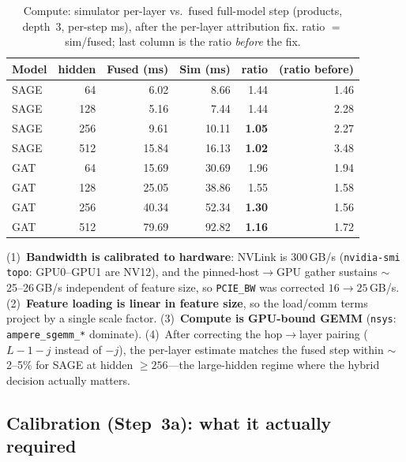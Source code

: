 \begin{table}[h]
\centering
\caption{Compute: simulator per-layer vs.\ fused full-model step (products, depth~3,
per-step ms), after the per-layer attribution fix. ratio $=$ sim/fused; last column is
the ratio \emph{before} the fix.}
\label{tab:micro-compute}
\begin{tabular}{l r r r r r}
\toprule
Model & hidden & Fused (ms) & Sim (ms) & ratio & (ratio before) \\
\midrule
SAGE & 64  & 6.02  & 8.66  & 1.44 & 1.46 \\
SAGE & 128 & 5.16  & 7.44  & 1.44 & 2.28 \\
SAGE & 256 & 9.61  & 10.11 & \textbf{1.05} & 2.27 \\
SAGE & 512 & 15.84 & 16.13 & \textbf{1.02} & 3.48 \\
GAT  & 64  & 15.69 & 30.69 & 1.96 & 1.94 \\
GAT  & 128 & 25.05 & 38.86 & 1.55 & 1.58 \\
GAT  & 256 & 40.34 & 52.34 & \textbf{1.30} & 1.56 \\
GAT  & 512 & 79.69 & 92.82 & \textbf{1.16} & 1.72 \\
\bottomrule
\end{tabular}
\end{table}

(1)~\textbf{Bandwidth is calibrated to hardware}: NVLink is $300$\,GB/s (\texttt{nvidia-smi
topo}: GPU0--GPU1 are NV12), and the pinned-host$\rightarrow$GPU gather sustains
$\sim$25--26\,GB/s independent of feature size, so \texttt{PCIE\_BW} was corrected
$16\rightarrow25$\,GB/s. (2)~\textbf{Feature loading is linear in feature size}, so the
load/comm terms project by a single scale factor. (3)~\textbf{Compute is GPU-bound GEMM}
(\texttt{nsys}: \texttt{ampere\_sgemm\_*} dominate). (4)~After correcting the
hop$\rightarrow$layer pairing ($L{-}1{-}j$ instead of $-j$), the per-layer estimate
matches the fused step within $\sim$2--5\% for SAGE at hidden $\ge 256$---the large-hidden
regime where the hybrid decision actually matters.

\subsection{Calibration (Step~3a): what it actually required}
\label{sec:sim-calibration}

